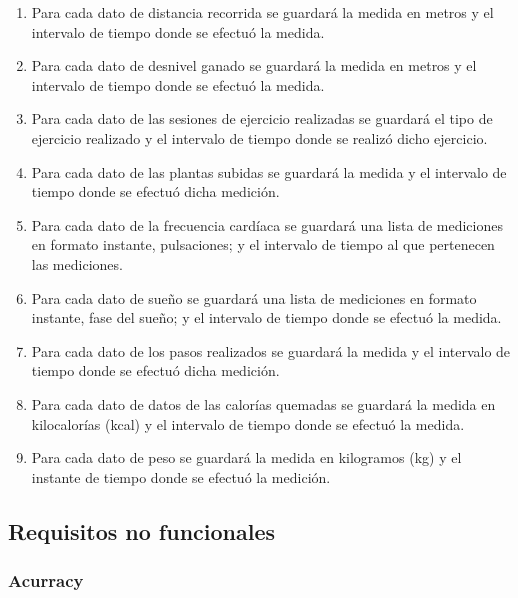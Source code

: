 \begin{enumerate}[label=\textbf{\texttt{RF-\arabic*}}]
            \item Para cada dato de distancia recorrida se guardará la medida en metros y el intervalo de tiempo donde se efectuó la medida.
            \item Para cada dato de desnivel ganado se guardará la medida en metros y el intervalo de tiempo donde se efectuó la medida.
            \item Para cada dato de las sesiones de ejercicio realizadas se guardará el tipo de ejercicio realizado y el intervalo de tiempo donde se realizó dicho ejercicio.
            \item Para cada dato de las plantas subidas se guardará la medida y el intervalo de tiempo donde se efectuó dicha medición.
            \item Para cada dato de la frecuencia cardíaca se guardará una lista de mediciones en formato instante, pulsaciones; y el intervalo de tiempo al que pertenecen las mediciones.
            \item Para cada dato de sueño se guardará una lista de mediciones en formato instante, fase del sueño; y el intervalo de tiempo donde se efectuó la medida.
            \item Para cada dato de los pasos realizados se guardará la medida y el intervalo de tiempo donde se efectuó dicha medición.
            \item Para cada dato de datos de las calorías quemadas se guardará la medida en kilocalorías (kcal) y el intervalo de tiempo donde se efectuó la medida.
            \item Para cada dato de peso se guardará la medida en kilogramos (kg) y el instante de tiempo donde se efectuó la medición.
            
        \end{enumerate}
    
    \subsection{Requisitos no funcionales}
        \label{req:especificos:no_funcionales}
        \subsubsection{Acurracy}
